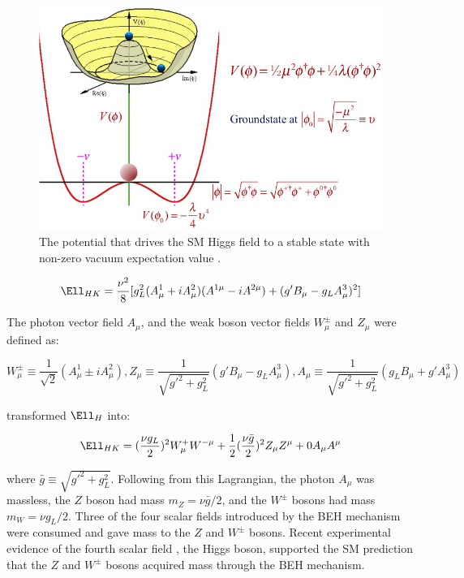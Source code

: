 \begin{figure}[h]
	\centering
	\includegraphics[width=1.0\textwidth]{figures/mexicanHatPotential.jpg}
	\caption{The potential that drives the SM Higgs field to a stable state with non-zero vacuum expectation value \cite{higgsPotential}.}
	\label{fig:smHiggsPotential}
\end{figure}

\begin{equation}
	\Ell_{HK} = \frac{\nu^{2}}{8}[g^{2}_{L}(A^{1}_{\mu} + iA^{2}_{\mu})(A^{1\mu} - iA^{2\mu}) + (g'B_{\mu} - g_{L}A^{3}_{\mu})^{2}]
\end{equation}

The photon vector field $A_{\mu}$, and the weak boson vector fields $W^{\pm}_{\mu}$ and $Z_{\mu}$ were defined as:

\begin{equation}
	W^{\pm}_{\mu} \equiv \frac{1}{\sqrt{2}}(A^{1}_{\mu} \pm iA^{2}_{\mu}), 
	Z_{\mu} \equiv \frac{1}{\sqrt{g'^{2} + g^{2}_{L}}}(g'B_{\mu} - g_{L}A^{3}_{\mu}), 
	A_{\mu} \equiv \frac{1}{\sqrt{g'^{2} + g^{2}_{L}}}(g_{L}B_{\mu} + g'A^{3}_{\mu})
\end{equation}

transformed $\Ell_{H}$ into:

\begin{equation}
	\Ell_{HK} = (\frac{\nu g_{L}}{2})^{2}W^{+}_{\mu}W^{-\mu} + \frac{1}{2}(\frac{\nu \bar{g}}{2})^{2}Z_{\mu}Z^{\mu} + 0A_{\mu}A^{\mu}
\end{equation}

where $\bar{g} \equiv \sqrt{g'^{2} + g^{2}_{L}}$.  Following from this Lagrangian, the photon $A_{\mu}$ was massless, 
the $Z$ boson had mass $m_{Z} = \nu\bar{g}/2$, and the $W^{\pm}$ bosons had mass $m_{W} = \nu g_{L}/2$.  
Three of the four scalar fields introduced by the BEH mechanism were consumed and gave mass to the $Z$ 
and $W^{\pm}$ bosons.  Recent experimental evidence of the fourth scalar field \cite{combinedHiggsResult}, the Higgs boson, 
supported the SM prediction that the $Z$ and $W^{\pm}$ bosons acquired mass through the BEH mechanism.

